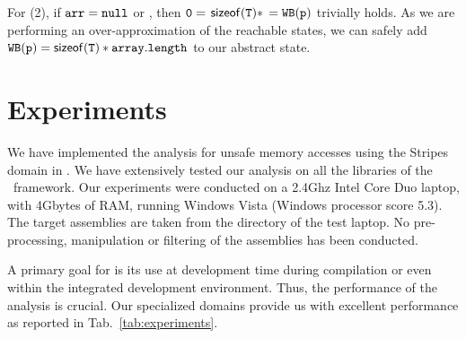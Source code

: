 \documentclass[10pt]{sigplanconf}
\newcommand{\mafcomment}[1]{{}}
\begin{document}
For (2), if $\mathtt{arr = null}$ or  , then
$\mathtt{0} = $ $ \mathsf{sizeof}(\mathtt{T})*$  $ = \mathtt{WB}(\mathtt{\mathtt{p}})
$ trivially holds.  As we are performing an over-approximation of the
reachable states, we can safely add $\mathtt{WB}(\mathtt{\mathtt{p}})
=\mathsf{sizeof}(\mathtt{T})*\mathtt{array.length}$ to our abstract state.


\section{Experiments}
\label{sec:Experiments}
We have implemented the analysis for unsafe memory accesses using the
Stripes domain in \Clousot. 
We have extensively tested our analysis on all the libraries of the \Net\ framework. 
Our experiments were conducted on a 2.4Ghz Intel Core Duo laptop, with 4Gbytes of RAM, running Windows Vista (Windows processor score 5.3). 
The target assemblies are taken from the     directory of the test laptop. 
No pre-processing, manipulation or filtering of the assemblies has been conducted.

A primary goal for \Clousot{} is its use at development time during
compilation or even within the integrated development environment.
Thus, the performance of the analysis is crucial. Our specialized
domains provide us with excellent performance as reported in Tab.~\ref{tab:experiments}. 



\mafcomment{Seems out of place:
\Clousot\ supports the entire set of \MSIL\ instructions, it performs intra-procedural analysis, and it uses contracts and inferred postconditions for inter-procedural analysis. 
When contracts are not available, it assumes the worst-case. 
This makes the analysis possibly imprecise, leading to false-positive warnings.
}
\end{document}
